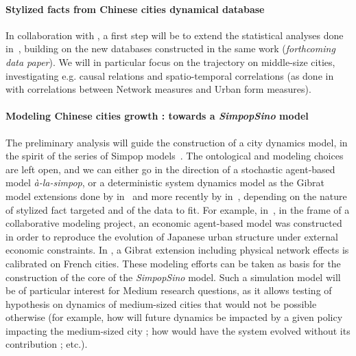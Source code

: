 %
%


\paragraph{Stylized facts from Chinese cities dynamical database}

In collaboration with , a first step will be to extend the statistical analyses done in~\cite{swerts2013systemes}, building on the new databases constructed in the same work (\textit{forthcoming data paper}). We will in particular focus on the trajectory on middle-size cities, investigating e.g. causal relations and spatio-temporal correlations (as done in~\cite{raimbault2016cautious} with correlations between Network measures and Urban form measures).



\paragraph{Modeling Chinese cities growth : towards a \textit{SimpopSino} model}

The preliminary analysis will guide the construction of a city dynamics model, in the spirit of the series of Simpop models~\cite{pumain2012multi}. The ontological and modeling choices are left open, and we can either go in the direction of a stochastic agent-based model \textit{{\`a}-la-simpop}, or a deterministic system dynamics model as the Gibrat model extensions done by  in~\cite{favaro2011gibrat} and more recently by  in~\cite{cottineau2015incremental}, depending on the nature of stylized fact targeted and of the data to fit. For example, in~\cite{raimbault2016simpopsan}, in the frame of a collaborative modeling project, an economic agent-based model was constructed in order to reproduce the evolution of Japanese urban structure under external economic constraints. In \cite{raimbault2016system}, a Gibrat extension including physical network effects is calibrated on French cities. These modeling efforts can be taken as basis for the construction of the core of the \emph{SimpopSino} model. Such a simulation model will be of particular interest for Medium research questions, as it allows testing of hypothesis on dynamics of medium-sized cities that would not be possible otherwise (for example, how will future dynamics be impacted by a given policy impacting the medium-sized city ; how would have the system evolved without its contribution ; etc.).



